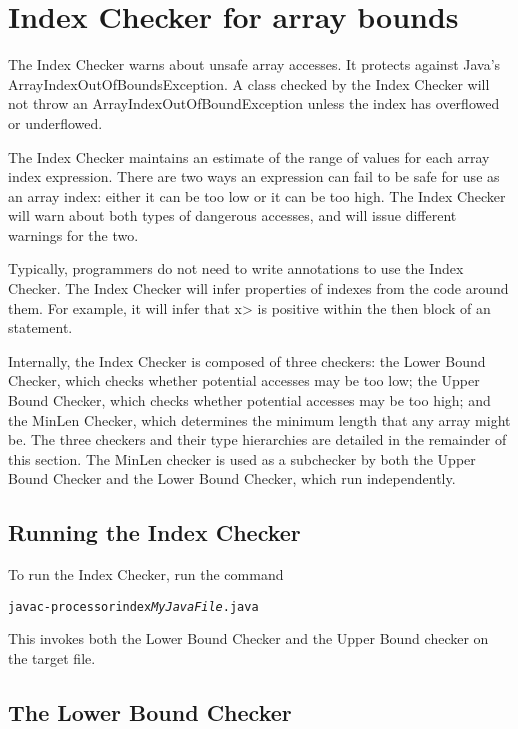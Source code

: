 \chapter{Index Checker for array bounds\label{index-checker}}

The Index Checker warns about unsafe array accesses.  It protects
against Java's ArrayIndexOutOfBoundsException. A class checked by the
Index Checker  will not throw an ArrayIndexOutOfBoundException unless the
index has overflowed or underflowed.

The Index Checker maintains an estimate of the range of values for each array
index expression.  There are two ways an expression can fail to be safe for use as an
array index: either it can be too low or it can be too high. The Index
Checker will warn about both types of dangerous accesses, and will
issue different warnings for the two.

Typically, programmers do not need to write annotations to use the
Index Checker. The Index Checker will infer properties of indexes from
the code around them.  For example, it will infer that \<x> is positive
within the then block of an  statement.

Internally, the Index Checker is composed of three checkers: the Lower
Bound Checker, which checks whether potential accesses may be too low;
the Upper Bound Checker, which checks whether potential accesses
may be too high; and the MinLen Checker, which determines the minimum
length that any array might be. The three checkers and their type hierarchies are
detailed in the remainder of this section. The MinLen checker is used as a
subchecker by both the Upper Bound Checker and the Lower Bound Checker,
which run independently.

\section{Running the Index Checker\label{index-running}}

To run the Index Checker, run the command

\begin{alltt}
  javac -processor index \emph{MyJavaFile}.java
\end{alltt}

This invokes both the Lower Bound Checker and the Upper Bound checker on the target file.

\section{The Lower Bound Checker\label{index-lowerbound}}

